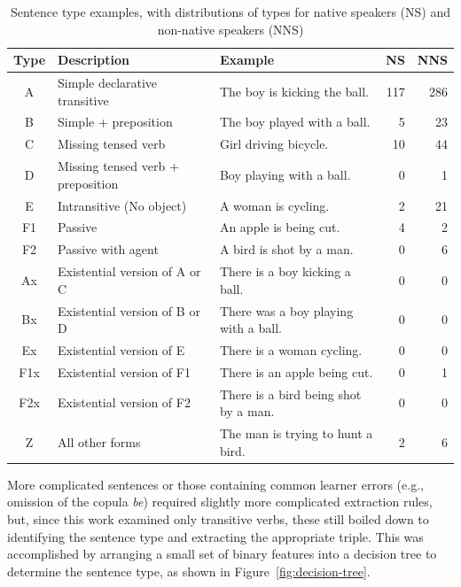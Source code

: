 \begin{table}[htb!]
\begin{center}
\begin{tabular}{|c|l|l|r|r|}
\hline
Type & Description & Example & NS & NNS \\
\hline
 A & Simple declarative transitive & The boy is kicking the ball. & 117 & 286 \\
 \hline
 B & Simple + preposition & The boy played with a ball. & 5 & 23 \\
 \hline
 C & Missing tensed verb & Girl driving bicycle. & 10 & 44 \\
 \hline
 D & Missing tensed verb + preposition & Boy playing with a ball. & 0 & 1 \\
 \hline
 E & Intransitive (No object) & A woman is cycling. & 2 & 21 \\
 \hline
 F1 & Passive & An apple is being cut. & 4 & 2 \\
 \hline
 F2 & Passive with agent & A bird is shot by a man. & 0 & 6 \\
 \hline
 Ax & Existential version of A or C & There is a boy kicking a ball. & 0 & 0 \\
 \hline
 Bx & Existential version of B  or D & There was a boy playing with a ball. & 0 & 0 \\
 \hline
 Ex & Existential version of E & There is a woman cycling. & 0 & 0 \\
 \hline
 F1x & Existential version of F1 & There is an apple being cut. & 0 & 1 \\
 \hline
 F2x & Existential version of F2 & There is a bird being shot by a man. & 0 & 0 \\
 \hline
 Z & All other forms & The man is trying to hunt a bird. & 2 & 6 \\
 \hline
\end{tabular}
\end{center}
\caption{Sentence type examples, with distributions of types for
  native speakers (NS) and non-native speakers (NNS)}
\label{tab:sentence-type}
\end{table}

More complicated sentences or those containing common learner errors
(e.g., omission of the copula \textit{be}) required slightly more
complicated extraction rules, but, since this work examined only transitive
verbs, these still boiled down to identifying the
sentence type and extracting the appropriate triple.  This was accomplished by
arranging a small set of binary features into a decision tree to
determine the sentence type, as shown in
Figure~\ref{fig:decision-tree}.


